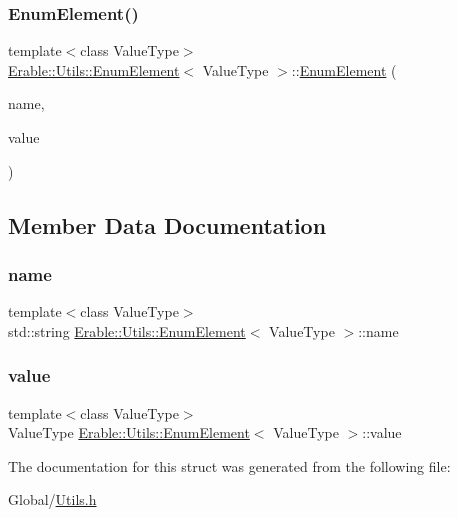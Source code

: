 \subsubsection{\texorpdfstring{EnumElement()}{EnumElement()}}
{\footnotesize\ttfamily template$<$class Value\+Type$>$ \\
\mbox{\hyperlink{struct_erable_1_1_utils_1_1_enum_element}{Erable\+::\+Utils\+::\+Enum\+Element}}$<$ Value\+Type $>$\+::\mbox{\hyperlink{struct_erable_1_1_utils_1_1_enum_element}{Enum\+Element}} (\begin{DoxyParamCaption}\item[{std\+::string}]{name,  }\item[{Value\+Type}]{value }\end{DoxyParamCaption})\hspace{0.3cm}{\ttfamily [inline]}}



\subsection{Member Data Documentation}
\mbox{\label{struct_erable_1_1_utils_1_1_enum_element_a1b5ca282ac97cac35ba1919d03168b80}} 
\subsubsection{\texorpdfstring{name}{name}}
{\footnotesize\ttfamily template$<$class Value\+Type$>$ \\
std\+::string \mbox{\hyperlink{struct_erable_1_1_utils_1_1_enum_element}{Erable\+::\+Utils\+::\+Enum\+Element}}$<$ Value\+Type $>$\+::name}

\mbox{\label{struct_erable_1_1_utils_1_1_enum_element_a8f6e0533bacee39dfe1a1231139a857c}} 
\subsubsection{\texorpdfstring{value}{value}}
{\footnotesize\ttfamily template$<$class Value\+Type$>$ \\
Value\+Type \mbox{\hyperlink{struct_erable_1_1_utils_1_1_enum_element}{Erable\+::\+Utils\+::\+Enum\+Element}}$<$ Value\+Type $>$\+::value}



The documentation for this struct was generated from the following file\+:\begin{DoxyCompactItemize}
\item 
Global/\mbox{\hyperlink{_utils_8h}{Utils.\+h}}\end{DoxyCompactItemize}
